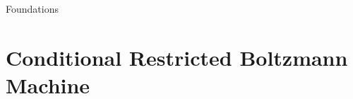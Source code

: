 \begin{frame}[t]{Foundations}
	\end{frame}
% 
% 
% 
% 

\section{Conditional Restricted Boltzmann Machine} %
